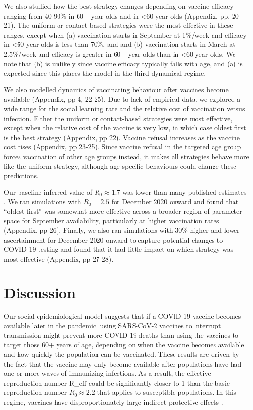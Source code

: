 We also studied how the best strategy changes depending on vaccine efficacy ranging from 40-90\% in 60+ year-olds and in <60 year-olds (Appendix, pp. 20-21). The uniform or contact-based strategies were the most effective in these ranges, except when (a) vaccination starts in September at 1\%/week and efficacy in <60 year-olds is less than 70\%, and and (b) vaccination starts in March at 2.5\%/week and efficacy is greater in 60+ year-olds than in <60 year-olds. We note that (b) is unlikely since vaccine efficacy typically falls with age, and (a) is expected since this places the model in the third dynamical regime. 

We also modelled dynamics of vaccinating behaviour after vaccines become available (Appendix, pp 4, 22-25).  Due to lack of empirical data, we explored a wide range for the social learning rate and the relative cost of vaccination versus infection.  Either the uniform or contact-based strategies were most effective, except when the relative cost of the vaccine is very low, in which case oldest first is the best strategy (Appendix, pp 22). Vaccine refusal increases as the vaccine cost rises (Appendix, pp 23-25). Since vaccine refusal in the targeted age group forces vaccination of other age groups instead, it makes all strategies behave more like the uniform strategy, although age-specific behaviours could change these predictions. 

Our baseline inferred value of $R_0 \approx 1.7$ was lower than many published estimates \cite{hilton2020estimation}.  We ran simulations with $R_0 = 2.5$ for December 2020 onward and found that “oldest first” was somewhat more effective across a broader region of parameter space for September availability, particularly at higher vaccination rates (Appendix, pp 26). Finally, we also ran simulations with 30\% higher and lower ascertainment for December 2020 onward to capture potential changes to COVID-19 testing and found that it had little impact on which strategy was most effective (Appendix, pp 27-28).  

\section{Discussion}

Our social-epidemiological model suggests that if a COVID-19 vaccine becomes available later in the pandemic, using SARS-CoV-2 vaccines to interrupt transmission might prevent more COVID-19 deaths than using the vaccines to target those 60+ years of age, depending on when the vaccine becomes available and how quickly the population can be vaccinated. These results are driven by the fact that the vaccine may only become available after populations have had one or more waves of immunizing infections. As a result, the effective reproduction number R_{eff} could be significantly closer to 1 than the basic reproduction number $R_0 \approx 2.2$ that applies to susceptible populations. In this regime, vaccines have disproportionately large indirect protective effects \cite{anderson1992infectious}.  

